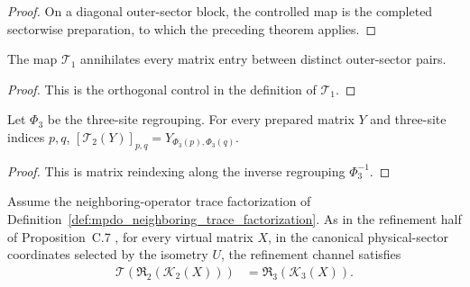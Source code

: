 \begin{proof}
    \leanok
    On a diagonal outer-sector block, the controlled map is the completed
    sectorwise preparation, to which the preceding theorem applies.
\end{proof}

\begin{lemma}
    \label{thm:mpdo_t1_off_diagonal_action}
    \leanok
    The map $\mathcal T_1$ annihilates every matrix entry between distinct
    outer-sector pairs.
\end{lemma}

\begin{proof}
    \leanok
    This is the orthogonal control in the definition of $\mathcal T_1$.
\end{proof}

\begin{lemma}
    \label{thm:mpdo_t2_reindexing_action}
    \leanok
    Let $\Phi_3$ be the three-site regrouping. For every prepared matrix $Y$
    and three-site indices $p,q$,
    $[\mathcal T_2(Y)]_{p,q}=Y_{\Phi_3(p),\Phi_3(q)}$.
\end{lemma}

\begin{proof}
    \leanok
    This is matrix reindexing along the inverse regrouping
    $\Phi_3^{-1}$.
\end{proof}

\begin{lemma}
    \label{thm:mpdo_physical_sector_t_closure_identity}
    \leanok
    Assume the neighboring-operator trace factorization of
    Definition~\ref{def:mpdo_neighboring_trace_factorization}. As in the
    refinement half of Proposition~C.7
    \cite[Appendix~C.2, lines~1510--1516 and~1522--1545]
    {Cirac2016MPDO_arXiv}, for every virtual matrix $X$, in the canonical
    physical-sector coordinates selected by the isometry $U$, the refinement
    channel satisfies
    \begin{align}
        \mathcal T(\mathfrak R_2(\mathcal K_2(X)))
         & =\mathfrak R_3(\mathcal K_3(X)).
        \label{eq:rfp_t_closure}
    \end{align}
\end{lemma}

